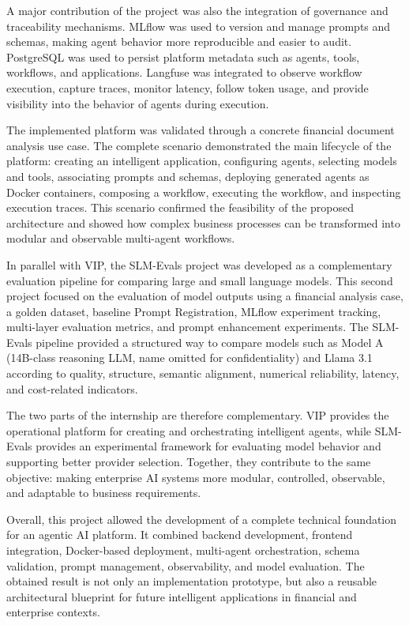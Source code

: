 A major contribution of the project was also the integration of governance and traceability mechanisms. MLflow was used to version and manage prompts and schemas, making agent behavior more reproducible and easier to audit. PostgreSQL was used to persist platform metadata such as agents, tools, workflows, and applications. Langfuse was integrated to observe workflow execution, capture traces, monitor latency, follow token usage, and provide visibility into the behavior of agents during execution.

The implemented platform was validated through a concrete financial document analysis use case. The complete scenario demonstrated the main lifecycle of the platform: creating an intelligent application, configuring agents, selecting models and tools, associating prompts and schemas, deploying generated agents as Docker containers, composing a workflow, executing the workflow, and inspecting execution traces. This scenario confirmed the feasibility of the proposed architecture and showed how complex business processes can be transformed into modular and observable multi-agent workflows.

In parallel with VIP, the SLM-Evals project was developed as a complementary evaluation pipeline for comparing large and small language models. This second project focused on the evaluation of model outputs using a financial analysis case, a golden dataset, baseline Prompt Registration, MLflow experiment tracking, multi-layer evaluation metrics, and prompt enhancement experiments. The SLM-Evals pipeline provided a structured way to compare models such as Model A (14B-class reasoning LLM, name omitted for confidentiality) and Llama 3.1 according to quality, structure, semantic alignment, numerical reliability, latency, and cost-related indicators.

The two parts of the internship are therefore complementary. VIP provides the operational platform for creating and orchestrating intelligent agents, while SLM-Evals provides an experimental framework for evaluating model behavior and supporting better provider selection. Together, they contribute to the same objective: making enterprise AI systems more modular, controlled, observable, and adaptable to business requirements.

Overall, this project allowed the development of a complete technical foundation for an agentic AI platform. It combined backend development, frontend integration, Docker-based deployment, multi-agent orchestration, schema validation, prompt management, observability, and model evaluation. The obtained result is not only an implementation prototype, but also a reusable architectural blueprint for future intelligent applications in financial and enterprise contexts.

